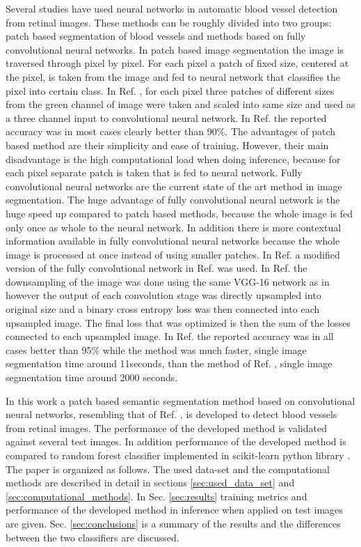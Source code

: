 \documentclass[aps,prb,10pt,twocolumn,groupedaddress]{revtex4-1}
\begin{document}
Several studies have used neural networks in automatic blood vessel detection from retinal images. These methods can be roughly divided into two groups: patch based segmentation of blood vessels\cite{tan} and methods based on fully convolutional neural networks\cite{long,hu}. In patch based image segmentation the image is traversed through pixel by pixel. For each pixel a patch of fixed size, centered at the pixel, is taken from the image and fed to neural network that classifies the pixel into certain class. In Ref. \cite{tan}, for each pixel three patches of different sizes from the green channel of image were taken and scaled into same size and used as a three channel input to convolutional neural network. In Ref. \cite{tan} the reported accuracy was in most cases clearly better than 90\%. 
The advantages of patch based method are their simplicity and ease of training. However, their main disadvantage is the high computational load when doing inference, because for each pixel separate patch is taken that is fed to neural network. Fully convolutional neural networks\cite{long} are the current state of the art method in image segmentation. The huge advantage of fully convolutional neural network is the huge speed up compared to patch based methods, because the whole image is fed only once as whole to the neural network. In addition there is more contextual information available in fully convolutional neural networks because the whole image is processed at once instead of using smaller patches. In Ref. \cite{hu} a modified version of the fully convolutional network in Ref. \cite{long} was used. In Ref. \cite{hu} the downsampling of the image was done using the same VGG-16 network as in \cite{long} however the output of each convolution stage was directly upsampled into original size and a binary cross entropy loss was then connected into each upsampled image. The final loss that was optimized is then the sum of the losses connected to each upsampled image. In Ref. \cite{hu} the reported accuracy was in all cases better than 95\% while the method was much faster, single image segmentation time around 11seconds, than the method of Ref. \cite{tan}, single image segmentation time around 2000 seconds.  

In this work a patch based semantic segmentation method based on convolutional neural networks, resembling that of Ref. \cite{tan},  is developed to detect blood vessels from retinal images. The performance of the developed method is validated against several test images. In addition performance of the developed method is compared to random forest classifier implemented in scikit-learn python library \cite{scikit-learn}.
The paper is organized as follows. The used data-set and the computational
methods are described in detail in sections \ref{sec:used_data_set} and \ref{sec:computational_methods}. In Sec. \ref{sec:results} training metrics and performance of the developed method in inference when applied on test images are given.
Sec. \ref{sec:conclusions} is a summary of the results and the differences between the two classifiers are discussed.
\end{document}
